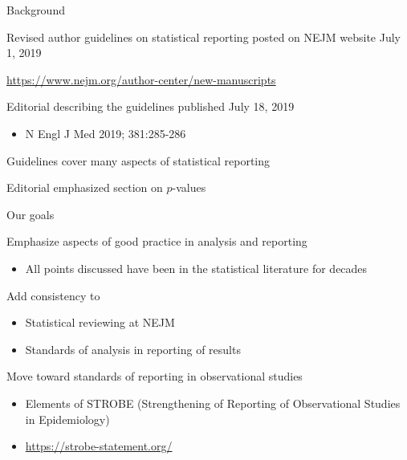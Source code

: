 \documentclass[ignorenonframetext,]{beamer}
\providecommand{\tightlist}{%
  \setlength{\itemsep}{0pt}\setlength{\parskip}{0pt}}
\begin{document}
\begin{frame}{Background}
\protect\hypertarget{background}{}

Revised author guidelines on statistical reporting posted on NEJM
website July 1, 2019

\url{https://www.nejm.org/author-center/new-manuscripts}

Editorial describing the guidelines published July 18, 2019

\begin{itemize}
\tightlist
\item
  N Engl J Med 2019; 381:285-286
\end{itemize}

Guidelines cover many aspects of statistical reporting

Editorial emphasized section on \(p\)-values

\end{frame}

\begin{frame}{Our goals}
\protect\hypertarget{our-goals}{}

Emphasize aspects of good practice in analysis and reporting

\begin{itemize}
\tightlist
\item
  All points discussed have been in the statistical literature for
  decades
\end{itemize}

Add consistency to

\begin{itemize}
\item
  Statistical reviewing at NEJM
\item
  Standards of analysis in reporting of results
\end{itemize}

Move toward standards of reporting in observational studies

\begin{itemize}
\item
  Elements of STROBE (Strengthening of Reporting of Observational
  Studies in Epidemiology)
\item
  \url{https://strobe-statement.org/}
\end{itemize}

\end{frame}
\end{document}
